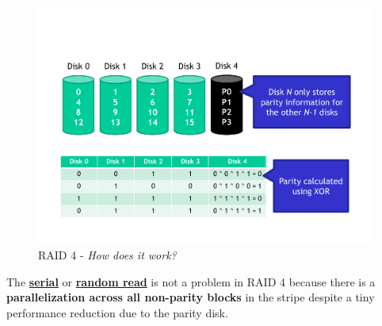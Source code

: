 \begin{figure}[!htp]
    \centering
    \includegraphics[width=\textwidth]{img/raid-6.pdf}
    \caption{RAID 4 - \emph{How does it work?}}
\end{figure}

\noindent
The \textbf{\underline{serial}} or \textbf{\underline{random read}} is not a problem in RAID 4 because there is a \textbf{parallelization across all non-parity blocks} in the stripe despite a tiny performance reduction due to the parity disk.

\newpage

